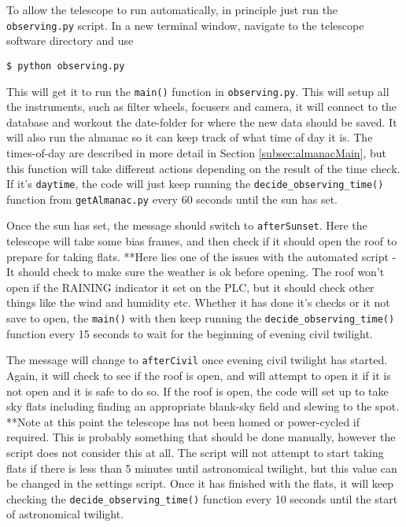 \documentclass[a4paper,12pt]{article}
\newcommand{\observing}{\tt{observing.py}}
\begin{document}
To allow the telescope to run automatically, in principle just run the {\observing} script. In a new terminal window, navigate to the telescope software directory and use
\begin{verbatim}
$ python observing.py
\end{verbatim}
This will get it to run the {\tt main()} function in {\observing}. This will setup all the instruments, such as filter wheels, focusers and camera, it will connect to the database and workout the date-folder for where the new data should be saved. It will also run the almanac so it can keep track of what time of day it is. The times-of-day are described in more detail in Section \ref{subsec:almanacMain}, but this function will take different actions depending on the result of the time check. If it's {\tt daytime}, the code will just keep running the {\tt decide\_observing\_time()} function from {\tt getAlmanac.py} every 60 seconds until the sun has set.

Once the sun has set, the message should switch to {\tt afterSunset}. Here the telescope will take some bias frames, and then check if it should open the roof to prepare for taking flats. {\color{blue}**Here lies one of the issues with the automated script - It should check to make sure the weather is ok before opening. The roof won't open if the RAINING indicator it set on the PLC, but it should check other things like the wind and humidity etc.} Whether it has done it's checks or it not save to open, the {\tt main()} with then keep running the {\tt decide\_observing\_time()} function every 15 seconds to wait for the beginning of evening civil twilight.

The message will change to {\tt afterCivil} once evening civil twilight has started. Again, it will check to see if the roof is open, and will attempt to open it if it is not open and it is safe to do so. If the roof is open, the code will set up to take sky flats including finding an appropriate blank-sky field and slewing to the spot. {\color{blue}**Note at this point the telescope has not been homed or power-cycled if required. This is probably something that should be done manually, however the script does not consider this at all.} The script will not attempt to start taking flats if there is less than 5 minutes until astronomical twilight, but this value can be changed in the settings script. Once it has finished with the flats, it will keep checking the {\tt decide\_observing\_time()} function every 10 seconds until the start of astronomical twilight.
\end{document}
